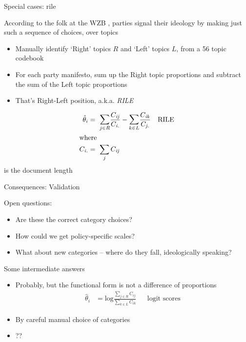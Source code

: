 \documentclass{hertieteaching}
\begin{document}
\begin{frame}{Special cases: rile}

According to the folk at the WZB \parencite{Budge.etal1987,Volkens.etal2020}, parties signal their ideology by making just such a sequence of choices, over topics
\begin{itemize}
  \item Manually identify `Right' topics $R$ and `Left' topics $L$, from a 56 topic codebook
  \item For each party manifesto, sum up the Right topic proportions and subtract the sum of the Left topic proportions
  \item That's Right-Left position, a.k.a. \textit{RILE}
\end{itemize}
\begin{align*}
\hat{\theta}_i &=~ \mathlarger{\sum}_{j \in R} \frac{C_\mathit{ij}}{C_\mathit{i.}} -
                 \mathlarger{\sum}_{k \in L} \frac{C_\mathit{ik}}{C_\mathit{j.}}& &\text{RILE}\\
                 \intertext{where}
C_\mathit{i.} &=~ \sum_{j} C_\mathit{ij}                
\end{align*}
is the document length
%
%
%
%

\end{frame}
\begin{frame}{Consequences: Validation}


Open questions:
\begin{itemize}
  \item Are these the correct category choices?
  \item How could we get policy-specific scales? \parencite{Lowe.etal2011,Benoit.etal2012a}
  \item What about new categories -- where do they fall, ideologically speaking?
\end{itemize}

Some intermediate answers \parencite{Lowe.etal2011}
\begin{itemize}
  \item Probably, but the functional form is not a difference of proportions
\begin{align*}
\hat{\theta}_i & = \text{log} \frac{\sum_{j \in R} C_{ij}}
                                   {\sum_{k \in L} C_{ik}} & & \text{logit scores}
\end{align*}
  \item By careful manual choice of categories
  \item ??
\end{itemize}

\end{frame}
\end{document}
